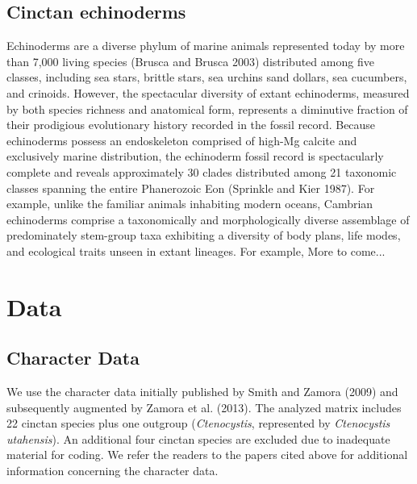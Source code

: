 \documentclass{article}
\begin{document}
\subsection{Cinctan echinoderms}
Echinoderms are a diverse phylum of marine animals represented today by more than 7,000 living species (Brusca and Brusca 2003) distributed among five classes, including sea stars, brittle stars, sea urchins sand dollars, sea cucumbers, and crinoids. However, the spectacular diversity of extant echinoderms, measured by both species richness and anatomical form, represents a diminutive fraction of their prodigious evolutionary history recorded in the fossil record. Because echinoderms possess an endoskeleton comprised of high-Mg calcite and exclusively marine distribution, the echinoderm fossil record is spectacularly complete and reveals approximately 30 clades distributed among 21 taxonomic classes spanning the entire Phanerozoic Eon (Sprinkle and Kier 1987). For example, unlike the familiar animals inhabiting modern oceans, Cambrian echinoderms comprise a taxonomically and morphologically diverse assemblage of predominately stem-group taxa exhibiting a diversity of body plans, life modes, and ecological traits unseen in extant lineages. 
For example, More to come... 

\section{Data}
\subsection{Character Data}
We use the character data initially published by Smith and Zamora (2009) and subsequently augmented by Zamora et al. (2013).  The analyzed matrix includes 22 cinctan species plus one outgroup (\textit{Ctenocystis}, represented by\textit{ Ctenocystis utahensis}). An additional four cinctan species are excluded due to inadequate material for coding.  We refer the readers to the papers cited above for additional information concerning the character data.
\end{document}
